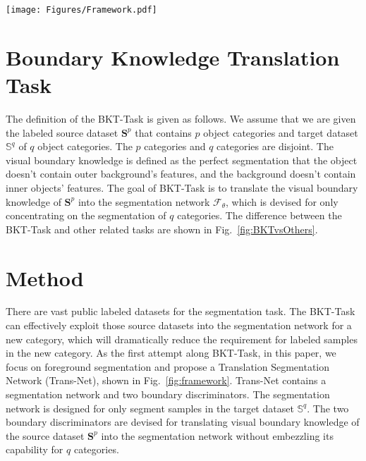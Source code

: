 \documentclass[letterpaper]{article} %
\begin{document}
\begin{figure*}[!t]
\centering
\texttt{[image: Figures/Framework.pdf]}
\caption{The framework of Trans-Net. The segmentation network is designed to segment the sample's foreground in the target dataset. The outer boundary discriminator is devised for distinguishing whether the segmented foreground contains the outer background's features. The inner boundary discriminator is devised for distinguishing whether the segmented background contains the inner foreground's features. Pseudo samples of source dataset are generated with the eroded and dilated masks, which can reinforce the visual boundary knowledge translation. Boundary-aware self-supervision is proposed to constrain the boundary invariance on the target dataset.}
\label{fig:framework}
\vspace{-1em}
\end{figure*}


\section{Boundary Knowledge Translation Task}
The definition of the BKT-Task is given as follows. We assume that we are given the labeled source dataset $\mathbf{S}^p$ that contains $p$ object categories and target dataset $\mathbb{S}^q$ of $q$ object categories. The $p$ categories and $q$ categories are disjoint.
The visual boundary knowledge is defined as the perfect segmentation that the object doesn't contain outer background's features, and the background doesn't contain inner objects' features.
The goal of BKT-Task is to translate the visual boundary knowledge of $\mathbf{S}^p$ into the segmentation network $\mathcal{F}_{\theta}$, which is devised for only concentrating on the segmentation of $q$ categories.
The difference between the BKT-Task and other related tasks are shown in Fig.~\ref{fig:BKTvsOthers}.

\section{Method}
There are vast public labeled datasets for the segmentation task. The BKT-Task can effectively exploit those source datasets into the segmentation network for a new category, which will dramatically reduce the requirement for labeled samples in the new category.
As the first attempt along BKT-Task,
in this paper,
we focus on foreground segmentation and propose a Translation Segmentation Network (Trans-Net),  shown in Fig.~\ref{fig:framework}. Trans-Net contains a segmentation network and two boundary discriminators. The segmentation network is designed for only segment samples in the target dataset $\mathbb{S}^q$. The two boundary discriminators are devised for translating visual boundary knowledge of the source dataset $\mathbf{S}^p$ into the segmentation network without embezzling its capability for $q$ categories.
\end{document}
